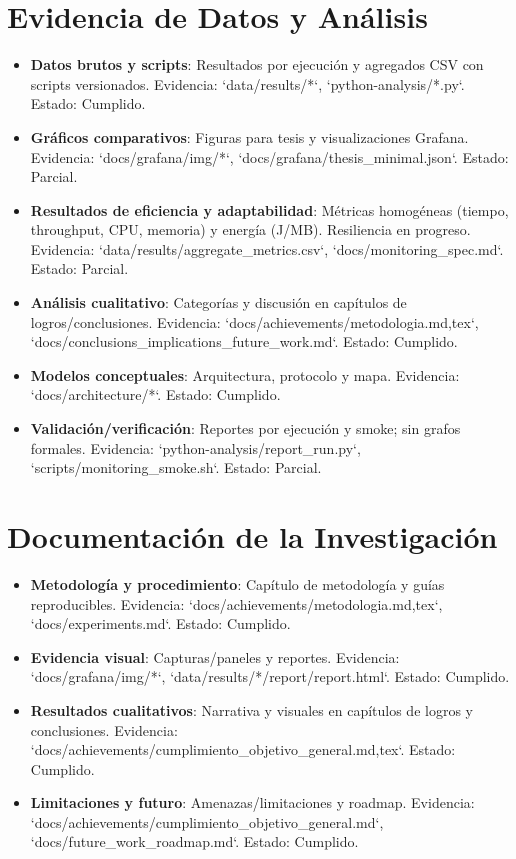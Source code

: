 \section{Evidencia de Datos y Análisis}
\begin{itemize}
  \item \textbf{Datos brutos y scripts}: Resultados por ejecución y agregados CSV con scripts versionados. Evidencia: `data/results/*`, `python-analysis/*.py`. Estado: Cumplido.
  \item \textbf{Gráficos comparativos}: Figuras para tesis y visualizaciones Grafana. Evidencia: `docs/grafana/img/*`, `docs/grafana/thesis_minimal.json`. Estado: Parcial.
  \item \textbf{Resultados de eficiencia y adaptabilidad}: Métricas homogéneas (tiempo, throughput, CPU, memoria) y energía (J/MB). Resiliencia en progreso. Evidencia: `data/results/aggregate_metrics.csv`, `docs/monitoring_spec.md`. Estado: Parcial.
  \item \textbf{Análisis cualitativo}: Categorías y discusión en capítulos de logros/conclusiones. Evidencia: `docs/achievements/metodologia.{md,tex}`, `docs/conclusions_implications_future_work.md`. Estado: Cumplido.
  \item \textbf{Modelos conceptuales}: Arquitectura, protocolo y mapa. Evidencia: `docs/architecture/*`. Estado: Cumplido.
  \item \textbf{Validación/verificación}: Reportes por ejecución y smoke; sin grafos formales. Evidencia: `python-analysis/report_run.py`, `scripts/monitoring_smoke.sh`. Estado: Parcial.
\end{itemize}

\section{Documentación de la Investigación}
\begin{itemize}
  \item \textbf{Metodología y procedimiento}: Capítulo de metodología y guías reproducibles. Evidencia: `docs/achievements/metodologia.{md,tex}`, `docs/experiments.md`. Estado: Cumplido.
  \item \textbf{Evidencia visual}: Capturas/paneles y reportes. Evidencia: `docs/grafana/img/*`, `data/results/*/report/report.html`. Estado: Cumplido.
  \item \textbf{Resultados cualitativos}: Narrativa y visuales en capítulos de logros y conclusiones. Evidencia: `docs/achievements/cumplimiento_objetivo_general.{md,tex}`. Estado: Cumplido.
  \item \textbf{Limitaciones y futuro}: Amenazas/limitaciones y roadmap. Evidencia: `docs/achievements/cumplimiento_objetivo_general.md`, `docs/future_work_roadmap.md`. Estado: Cumplido.
\end{itemize}

